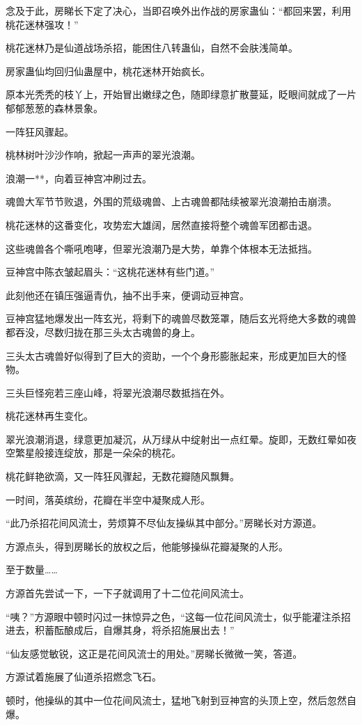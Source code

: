 \begin{this_body}
念及于此，房睇长下定了决心，当即召唤外出作战的房家蛊仙：“都回来罢，利用桃花迷林强攻！”

桃花迷林乃是仙道战场杀招，能困住八转蛊仙，自然不会肤浅简单。

房家蛊仙均回归仙蛊屋中，桃花迷林开始疯长。

原本光秃秃的枝丫上，开始冒出嫩绿之色，随即绿意扩散蔓延，眨眼间就成了一片郁郁葱葱的森林景象。

一阵狂风骤起。

桃林树叶沙沙作响，掀起一声声的翠光浪潮。

浪潮一**，向着豆神宫冲刷过去。

魂兽大军节节败退，外围的荒级魂兽、上古魂兽都陆续被翠光浪潮拍击崩溃。

桃花迷林的这番变化，攻势宏大雄阔，居然直接将整个魂兽军团都击退。

这些魂兽各个嘶吼咆哮，但翠光浪潮乃是大势，单靠个体根本无法抵挡。

豆神宫中陈衣皱起眉头：“这桃花迷林有些门道。”

此刻他还在镇压强逼青仇，抽不出手来，便调动豆神宫。

豆神宫猛地爆发出一阵玄光，将剩下的魂兽尽数笼罩，随后玄光将绝大多数的魂兽都吞没，尽数归拢在那三头太古魂兽的身上。

三头太古魂兽好似得到了巨大的资助，一个个身形膨胀起来，形成更加巨大的怪物。

三头巨怪宛若三座山峰，将翠光浪潮尽数抵挡在外。

桃花迷林再生变化。

翠光浪潮消退，绿意更加凝沉，从万绿从中绽射出一点红晕。旋即，无数红晕如夜空繁星般接连绽放，那是一朵朵的桃花。

桃花鲜艳欲滴，又一阵狂风骤起，无数花瓣随风飘舞。

一时间，落英缤纷，花瓣在半空中凝聚成人形。

“此乃杀招花间风流士，劳烦算不尽仙友操纵其中部分。”房睇长对方源道。

方源点头，得到房睇长的放权之后，他能够操纵花瓣凝聚的人形。

至于数量……

方源首先尝试一下，一下子就调用了十二位花间风流士。

“咦？”方源眼中顿时闪过一抹惊异之色，“这每一位花间风流士，似乎能灌注杀招进去，积蓄酝酿成后，自爆其身，将杀招施展出去！”

“仙友感觉敏锐，这正是花间风流士的用处。”房睇长微微一笑，答道。

方源试着施展了仙道杀招燃念飞石。

顿时，他操纵的其中一位花间风流士，猛地飞射到豆神宫的头顶上空，然后忽然自爆。


\end{this_body}
